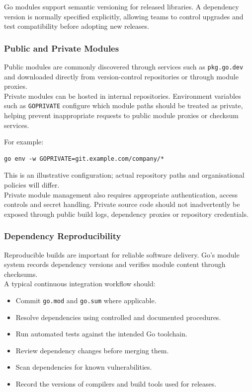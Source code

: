 Go modules support semantic versioning for released libraries. A dependency version is normally specified explicitly, allowing teams to control upgrades and test compatibility before adopting new releases.

\subsubsection{Public and Private Modules}

Public modules are commonly discovered through services such as \texttt{pkg.go.dev} and downloaded directly from version-control repositories or through module proxies.\\

Private modules can be hosted in internal repositories. Environment variables such as \texttt{GOPRIVATE} configure which module paths should be treated as private, helping prevent inappropriate requests to public module proxies or checksum services.

For example:

\begin{lstlisting}
go env -w GOPRIVATE=git.example.com/company/*
\end{lstlisting}

This is an illustrative configuration; actual repository paths and organisational policies will differ.\\

Private module management also requires appropriate authentication, access controls and secret handling. Private source code should not inadvertently be exposed through public build logs, dependency proxies or repository credentials.

\subsubsection{Dependency Reproducibility}

Reproducible builds are important for reliable software delivery. Go's module system records dependency versions and verifies module content through checksums.\\

A typical continuous integration workflow should:

\begin{itemize}
    \item Commit \texttt{go.mod} and \texttt{go.sum} where applicable.
    \item Resolve dependencies using controlled and documented procedures.
    \item Run automated tests against the intended Go toolchain.
    \item Review dependency changes before merging them.
    \item Scan dependencies for known vulnerabilities.
    \item Record the versions of compilers and build tools used for releases.
\end{itemize}

